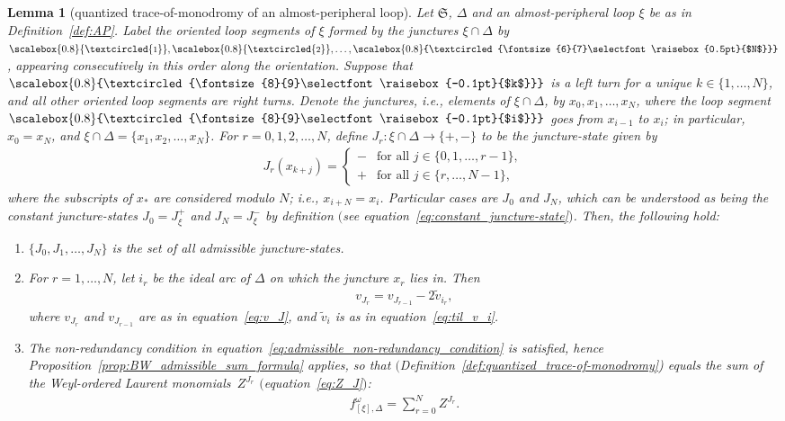 \documentclass[10pt,a4paper]{amsart}
\numberwithin{equation}{section}
\newtheorem{Lemma}[Theorem]{Lemma}
\theoremstyle{definition}
\newcommand{\circled}[1]{\scalebox{0.8}{\textcircled{\fontsize{8}{9}\selectfont \raisebox{-0.1pt}{#1}}}}
\newcommand{\circledd}[1]{\scalebox{0.8}{\textcircled{\fontsize{6}{7}\selectfont \raisebox{0.5pt}{#1}}}}
\newcommand{\til}[1]{\widetilde{#1}}
\begin{document}
\begin{Lemma}[quantized trace-of-monodromy of an almost-peripheral loop]
\label{lem:AP}
Let $\mathfrak{S}$, $\Delta$ and an almost-peripheral loop $\xi$ be as in Definition~{\rm \ref{def:AP}}. Label the oriented loop segments of $\xi$ formed by the junctures $\xi \cap \Delta$ by {\rm $\circled{1}, \circled{2},\dots,\circledd{$N$}$}, appearing consecutively in this order along the orientation. Suppose that {\rm $\circled{$k$}$} is a left turn for a unique $k \in\{1,\dots,N\}$, and all other oriented loop segments are right turns.
Denote the junctures, i.e., elements of $\xi \cap \Delta$, by $x_0,x_1,\dots,x_N$, where the loop segment {\rm $\circled{$i$}$} goes from $x_{i-1}$ to $x_i$; in particular, $x_0 = x_N$, and $\xi\cap\Delta = \{x_1,x_2,\dots,x_N\}$.
For $r=0,1,2,\dots,N$, define $J_r \colon \xi \cap \Delta \to \{+,-\}$ to be the juncture-state given by
\begin{align*}
J_r(x_{k+j}) = \begin{cases}
- & \mbox{for all $j\in \{0,1,\dots,r-1\}$}, \\
+ & \mbox{for all $j\in \{r,\dots,N-1\}$},
\end{cases}
\end{align*}
where the subscripts of $x_*$ are considered modulo $N$; i.e., $x_{i+N} = x_i$. Particular cases are $J_0$ and $J_N$, which can be understood as being the constant juncture-states $J_0 = J_\xi^+$ and $J_N = J_\xi^-$ by definition $($see equation~\eqref{eq:constant_juncture-state}$)$.
Then, the following hold:
\begin{enumerate}[label={\rm (AP\arabic*)}]\itemsep=0pt\setlength{\leftskip}{0.28cm}
\item\label{AP1} $\{J_0,J_1,\dots,J_N\}$ is the set of all admissible juncture-states.
\item\label{AP2} For $r=1,\dots,N$, let $i_r$ be the ideal arc of $\Delta$ on which the juncture $x_r$ lies in. Then
\begin{align}
\label{eq:AP2}
v_{J_r} = v_{J_{r-1}} - 2 \til{v}_{i_r},
\end{align}
where $v_{J_r}$ and $v_{J_{r-1}}$ are as in equation~\eqref{eq:v_J}, and $\til{v}_i$ is as in equation~\eqref{eq:til_v_i}.
\item\label{AP3} The non-redundancy condition in equation~\eqref{eq:admissible_non-redundancy_condition} is satisfied, hence Proposition~{\rm \ref{prop:BW_admissible_sum_formula}} applies, so that  $($Definition~{\rm \ref{def:quantized_trace-of-monodromy})} equals the sum of the Weyl-ordered Laurent monomials~$Z^{J_r}$ $($equation~\eqref{eq:Z_J}$)$:
\begin{align*}
f^\omega_{[\xi],\Delta} = \sum_{r=0}^N Z^{J_r}.
\end{align*}
\end{enumerate}
\end{Lemma}
\end{document}
